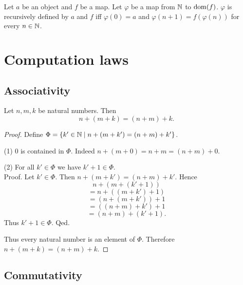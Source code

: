 \documentclass[../arithmetic.tex]{subfiles}
\begin{document}
  \begin{forthel}
    \begin{proposition}
      Let $a$ be an object and $f$ be a map.
      Let $\varphi$ be a map from $\mathbb{N}$ to $\operatorname{dom}(f)$.
      $\varphi$ is recursively defined by $a$ and $f$ iff $\varphi(0) = a$ and
      $\varphi(n + 1) = f(\varphi(n))$ for every $n \in \mathbb{N}$.
    \end{proposition}
  \end{forthel}


  \section{Computation laws}

  \subsection*{Associativity}

  \begin{forthel}
    \begin{proposition}
      Let $n, m, k$ be natural numbers.
      Then \[ n + (m + k) = (n + m) + k. \]
    \end{proposition}
    \begin{proof}
      Define $\Phi = \{ k' \in \mathbb{N} \mid n + (m + k') = (n + m) + k' \}$.

      (1) $0$ is contained in $\Phi$.
      Indeed $n + (m + 0) = n + m = (n + m) + 0$.

      (2) For all $k' \in \Phi$ we have $k' + 1 \in \Phi$. \\
      Proof.
        Let $k' \in \Phi$.
        Then $n + (m + k') = (n + m) + k'$.
        Hence
        \[  n + (m + (k' + 1))        \]
        \[    = n + ((m + k') + 1)    \]
        \[    = (n + (m + k')) + 1    \]
        \[    = ((n + m) + k') + 1    \]
        \[    = (n + m) + (k' + 1).   \]
        Thus $k' + 1 \in \Phi$.
      Qed.

      Thus every natural number is an element of $\Phi$.
      Therefore $n + (m + k) = (n + m) + k$.
    \end{proof}
  \end{forthel}


  \subsection*{Commutativity}
\end{document}
